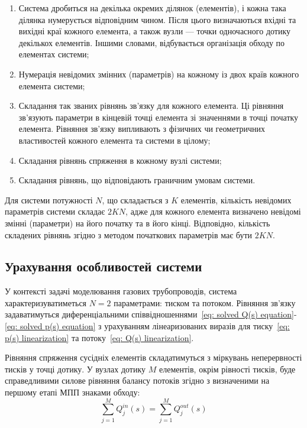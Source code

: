 \documentclass{mathreport}
\begin{document}
\begin{enumerate}
    \item Система дробиться на декілька окремих ділянок (елементів), і кожна така ділянка нумерується відповідним чином. Після цього визначаються вхідні та вихідні краї кожного елемента, а також вузли --- точки одночасного дотику декількох елементів. Іншими словами, відбувається організація обходу по елементах системи;
    \item Нумерація невідомих змінних (параметрів) на кожному із двох країв кожного елемента системи;
    \item Складання так званих рівнянь зв’язку для кожного елемента. Ці рівняння зв’язують параметри в кінцевій точці елемента зі значеннями в точці початку елемента. Рівняння зв'язку випливають з фізичних чи геометричних властивостей кожного елемента та системи в цілому;
    \item Складання рівнянь спряження в кожному вузлі системи;
    \item Складання рівнянь, що відповідають граничним умовам системи.
\end{enumerate}

Для системи потужності $N$, що складається з $K$ елементів, кількість невідомих параметрів системи складає $2KN$, адже для кожного елемента визначено невідомі змінні (параметри) на його початку та в його кінці. Відповідно, кількість складених рівнянь згідно з методом початкових параметрів має бути $2KN$.  

\subsection*{Урахування особливостей системи}

У контексті задачі моделювання газових трубопроводів, система характеризуватиметься $N=2$ параметрами: тиском та потоком. Рівняння зв'язку задаватимуться диференціальними співвідношеннями~\eqref{eq: solved Q(s) equation}-\eqref{eq: solved p(s) equation} з урахуванням лінеаризованих виразів для тиску~\eqref{eq: p(s) linearization} та потоку~\eqref{eq: Q(s) linearization}. 

Рівняння спряження сусідніх елементів складатимуться з міркувань неперервності тисків у точці дотику. У вузлах дотику $M$ елементів, окрім рівності тисків, буде справедливими силове рівняння балансу потоків згідно з визначеними на першому етапі МПП знаками обходу:
\begin{equation}\label{eq: force equation}
    \sum\limits_{j=1}^{M}{Q_j^{in}(s)} = \sum\limits_{j=1}^{M}{Q_j^{out}(s)}
\end{equation} 
\end{document}
